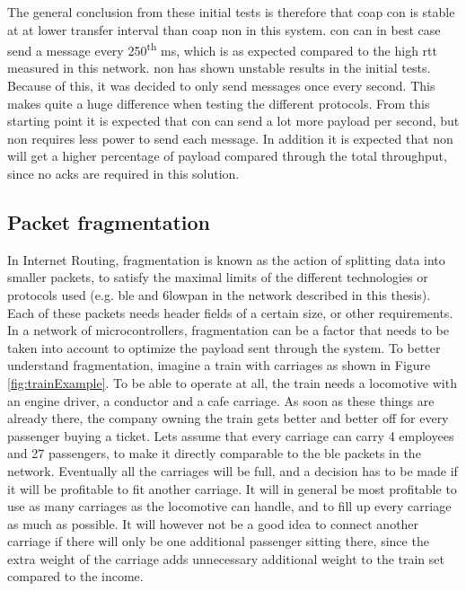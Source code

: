 \noindent The general conclusion from these initial tests is therefore that \gls{coap} \gls{con} is stable at at lower transfer interval than \gls{coap} \gls{non} in this system. \gls{con} can in best case send a message every 250\textsuperscript{th} ms, which is as expected compared to the high \gls{rtt} measured in this network. \gls{non} has shown unstable results in the initial tests. Because of this, it was decided to only send messages once every second. This makes quite a huge difference when testing the different protocols. From this starting point it is expected that \gls{con} can send a lot more \gls{payload} per second, but \gls{non} requires less power to send each message. In addition it is expected that \gls{non} will get a higher percentage of \gls{payload} compared through the total throughput, since no \glspl{ack} are required in this solution.


\subsection{Packet fragmentation}

\noindent In Internet Routing, fragmentation is known as the action of splitting data into smaller \glspl{packet}, to satisfy the maximal limits of the different technologies or protocols used (e.g. \gls{ble} and \gls{6lowpan} in the network described in this thesis). Each of these packets needs header fields of a certain size, or other requirements. In a network of \glspl{microcontroller}, fragmentation can be a factor that needs to be taken into account to optimize the \gls{payload} sent through the system. To better understand fragmentation, imagine a train with carriages as shown in Figure \ref{fig:trainExample}. To be able to operate at all, the train needs a locomotive with an engine driver, a conductor and a cafe carriage. As soon as these things are already there, the company owning the train gets better and better off for every passenger buying a ticket. Lets assume that every carriage can carry 4 employees and 27 passengers, to make it directly comparable to the \gls{ble} packets in the network. Eventually all the carriages will be full, and a decision has to be made if it will be profitable to fit another carriage. It will in general be most profitable to use as many carriages as the locomotive can handle, and to fill up every carriage as much as possible. It will however not be a good idea to connect another carriage if there will only be one additional passenger sitting there, since the extra weight of the carriage adds unnecessary additional weight to the train set compared to the income. 

